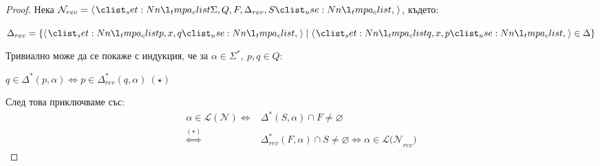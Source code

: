 \begin{proof}
    Нека $\mathcal{N}_{rev} = \opair{\Sigma, Q, F, \Delta_{rev}, S}$, където:
    \begin{center}
        $\Delta_{rev} = \{ \opair{p, x, q} \mid \opair{q, x, p} \in \Delta \}$
    \end{center}
    Тривиално може да се покаже с индукция, че за $\alpha \in \Sigma^*, \: p, q \in Q$:
    \begin{center}
        $q \in \Delta^*(p, \alpha) \iff p \in \Delta_{rev}^*(q, \alpha) \: (\star)$
    \end{center}
    След това приключваме със:
    \begin{align*}
        \alpha \in \mathcal{L(N)} \iff & \Delta^*(S, \alpha) \cap F \neq \varnothing                                            \\
        \stackrel{(\star)}{\iff}       & \Delta_{rev}^*(F, \alpha) \cap S \neq \varnothing \iff \alpha \in \mathcal{L(N}_{rev})
    \end{align*}
\end{proof}